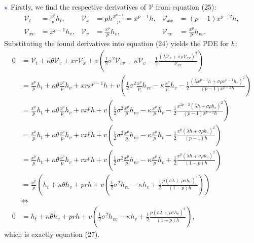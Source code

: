 \documentclass[11pt]{article}
\numberwithin{equation}{section}
\begin{document}
\newpage
$\textcolor{blue}{\star}$ Firstly, we find the respective
derivatives of $\mathcal{V}$ from equation (25):
\begin{align*}
    \mathcal{V}_t &= \frac{x^p}{p} h_t, & \mathcal{V}_x &=ph\frac{x^{p-1}}{p} = x^{p-1}h, & \mathcal{V}_{xx} &= (p - 1)x^{p-2}h, \\
    \mathcal{V}_{xv} &= x^{p-1}h_v, & \mathcal{V}_v &= \frac{x^p}{p} h_v, & \mathcal{V}_{vv} &= \frac{x^p}{p} h_{vv}.
    \end{align*}
Substituting the found derivatives into equation (24) yields the PDE for $h$:
\begin{align*}
    0 &= \mathcal{V}_t + \kappa\theta\mathcal{V}_v + xr\mathcal{V}_x + v \left( \frac{1}{2} \sigma^2 \mathcal{V}_{vv} - \kappa \mathcal{V}_v - \frac{1}{2}\frac{ \left( \bar{\lambda}\mathcal{V}_x + \sigma\rho\mathcal{V}_{xv} \right)^2 }{\mathcal{V}_{xx}} \right) \\
    &= \frac{x^p}{p} h_t + \kappa\theta \frac{x^p}{p} h_v + xrx^{p-1}h + v \left( \frac{1}{2} \sigma^2 \frac{x^p}{p} h_{vv} - \kappa \frac{x^p}{p} h_v - \frac{1}{2} \frac{\left ( \bar{\lambda}x^{p-1}h+\sigma\rho x^{p-1}h_v\right )^2}{(p-1)x^{p-2}h}\right) \\
    &= \frac{x^p}{p} h_t + \kappa\theta \frac{x^p}{p} h_v + rx^p h + v \left( \frac{1}{2} \sigma^2 \frac{x^p}{p} h_{vv} - \kappa \frac{x^p}{p} h_v - \frac{1}{2} \frac{x^{2p-2}\left (\bar{\lambda} h+\sigma\rho h_v\right )^2}{(p-1)x^{p-2}h} \right) \\
    &= \frac{x^p}{p} h_t + \kappa\theta \frac{x^p}{p} h_v + rx^p h + v \left( \frac{1}{2} \sigma^2 \frac{x^p}{p} h_{vv} - \kappa \frac{x^p}{p} h_v - \frac{1}{2} \frac{x^p\left (\bar{\lambda} h+\sigma\rho h_v\right )^2}{(p-1)h} \right) \\
    &= \frac{x^p}{p} h_t + \kappa\theta \frac{x^p}{p} h_v + rx^p h + v \left( \frac{1}{2} \sigma^2 \frac{x^p}{p} h_{vv} - \kappa \frac{x^p}{p} h_v + \frac{1}{2} \frac{x^p\left (\bar{\lambda} h+\sigma\rho h_v\right )^2}{(1-p)h} \right)  \\
    &= \frac{x^p}{p} \left( h_t + \kappa\theta h_v + prh + v \left( \frac{1}{2} \sigma^2 h_{vv} - \kappa h_v + \frac{1}{2}\frac{p\left(h\bar{\lambda}+\rho \sigma h_v \right)^2}{(1-p)h}\right) \right) \\
    &\iff\\
    0 &= h_t + \kappa\theta h_v + prh + v \left( \frac{1}{2} \sigma^2 h_{vv} - \kappa h_v + \frac{1}{2} \frac{p\left(h\bar{\lambda}+\rho \sigma h_v \right)^2}{(1-p)h}\right),
\end{align*}
which is exactly equation (27).
\end{document}
